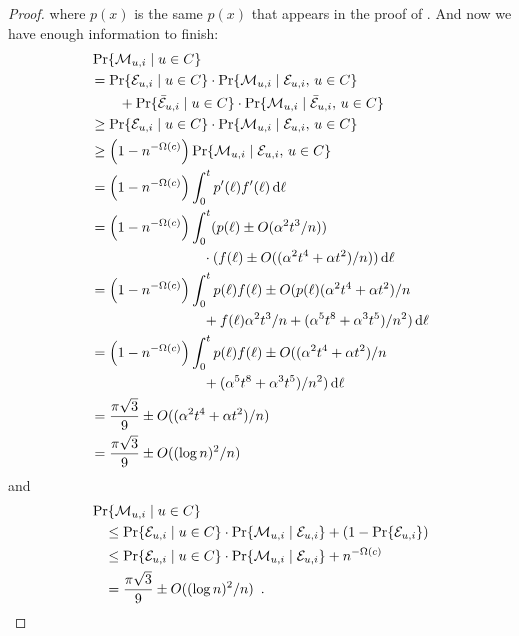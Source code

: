 \documentclass[twoside,leqno,twocolumn]{article}
\newcommand\qedhere{}{}
\begin{document}
\begin{proof}
where $p(x)$ is the same $p(x)$ that appears in the proof of .
And now we have enough information to finish:
\begin{align*}
    &\Pr\{\mathcal{M}_{u,i} \mid u\in C\}  \\
         & = \Pr\{\mathcal{E}_{u,i}\mid u\in C\}\cdot \Pr\{\mathcal{M}_{u,i}\mid \mathcal{E}_{u,i},\,u\in C\} 
            \\ & \qquad {}+\Pr\{\bar{\mathcal{E}}_{u,i}\mid u\in C\}\cdot\Pr\{\mathcal{M}_{u,i}\mid\bar{\mathcal{E}}_{u,i},\,u\in C\} \\
         & \ge \Pr\{\mathcal{E}_{u,i}\mid u\in C\}\cdot \Pr\{\mathcal{M}_{u,i}\mid \mathcal{E}_{u,i},\,u\in C\} \\
         & \ge \left(1-n^{-\Omega(c)}\right)
                \Pr\{\mathcal{M}_{u,i}\mid \mathcal{E}_{u,i},\,u\in C\} \\
         & = \left(1-n^{-\Omega(c)}\right)
                 \int_0^t p'(\ell)f'(\ell)\,\mathrm{d}\ell \\
         & = \left(1-n^{-\Omega(c)}\right)
            \int_0^t (p(\ell)\pm O(\alpha^2t^3/n)) \\
           & \qquad\qquad\qquad\qquad \cdot(f(\ell)\pm O((\alpha^2 t^4+\alpha t^2)/n))\,\mathrm{d}{\ell} \\
         & = \left(1-n^{-\Omega(c)}\right)\int_0^t p(\ell)f(\ell)
           \pm O(p(\ell)(\alpha^2t^4+\alpha t^2)/n \\
            & \qquad\qquad\qquad\qquad + f(\ell)\alpha^2t^3/n + (\alpha^5t^8+\alpha^3t^5)/n^2)
            \,\mathrm{d}{\ell} \\
         & = \left(1-n^{-\Omega(c)}\right)\int_0^t p(\ell)f(\ell)
           \pm O((\alpha^2t^4+\alpha t^2)/n \\
           &\qquad\qquad\qquad\qquad + (\alpha^5t^8+\alpha^3t^5)/n^2)
            \,\mathrm{d}{\ell} \\
        & = \frac{\pi\sqrt{3}}{9} \pm O((\alpha^2t^4+\alpha t^2)/n) \\
        & =  \frac{\pi\sqrt{3}}{9} \pm O((\log n)^2/n)
\end{align*}
and
\begin{align*}
    & \Pr\{\mui \mid u\in C\} \\
       &\quad \le \Pr\{\eui\mid u\in C\}\cdot \Pr\{\mui\mid \eui\}
           + (1-\Pr\{\eui\}) \\
       &\quad \le \Pr\{\eui\mid u\in C\}\cdot \Pr\{\mui\mid \eui\} 
           + n^{-\Omega(c)} \\
         &\quad = \frac{\pi\sqrt{3}}{9} \pm O((\log n)^2/n) \enspace . \qedhere
\end{align*} 
\end{proof}
\end{document}
